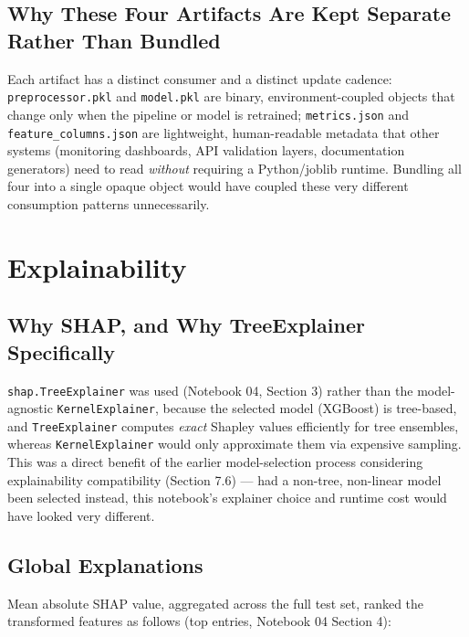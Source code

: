 \documentclass[11pt]{article}
\newcommand{\artifact}[1]{\texttt{\color{navy}#1}}
\begin{document}
\subsection{Why These Four Artifacts Are Kept Separate Rather Than Bundled}

Each artifact has a distinct consumer and a distinct update cadence: \artifact{preprocessor.pkl} and \artifact{model.pkl} are binary, environment-coupled objects that change only when the pipeline or model is retrained; \artifact{metrics.json} and \artifact{feature\_columns.json} are lightweight, human-readable metadata that other systems (monitoring dashboards, API validation layers, documentation generators) need to read \emph{without} requiring a Python/joblib runtime. Bundling all four into a single opaque object would have coupled these very different consumption patterns unnecessarily.

\section{Explainability}
\label{sec:explainability}

\subsection{Why SHAP, and Why TreeExplainer Specifically}

\texttt{shap.TreeExplainer} was used (Notebook 04, Section 3) rather than the model-agnostic \texttt{KernelExplainer}, because the selected model (XGBoost) is tree-based, and \texttt{TreeExplainer} computes \emph{exact} Shapley values efficiently for tree ensembles, whereas \texttt{KernelExplainer} would only approximate them via expensive sampling. This was a direct benefit of the earlier model-selection process considering explainability compatibility (Section 7.6) --- had a non-tree, non-linear model been selected instead, this notebook's explainer choice and runtime cost would have looked very different.

\subsection{Global Explanations}

Mean absolute SHAP value, aggregated across the full test set, ranked the transformed features as follows (top entries, Notebook 04 Section 4):
\end{document}
